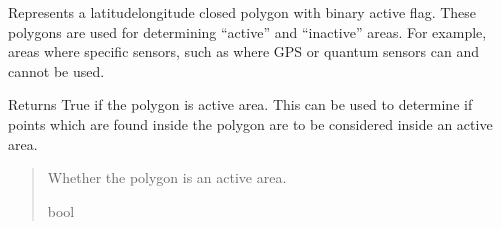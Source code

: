 \documentclass[letterpaper,10pt,english]{sphinxmanual}
\begin{document}
\begin{fulllineitems}
\label{\detokenize{modules/gps/zones:qnav.gps.zones.FlaggedPolygon}}
\pysigstartsignatures
{}
\pysigstopsignatures
\sphinxAtStartPar
Represents a latitude\sphinxhyphen{}longitude closed polygon with binary active flag.
These polygons are used for determining “active” and “inactive” areas.
For example, areas where specific sensors, such as where GPS or
quantum sensors can and cannot be used.

\begin{fulllineitems}
\label{\detokenize{modules/gps/zones:qnav.gps.zones.FlaggedPolygon.is_active_area}}
\pysigstartsignatures
{}
\pysigstopsignatures
\sphinxAtStartPar
Returns True if the polygon is active area.
This can be used to determine if points which are found inside the
polygon are to be considered inside an active area.
\begin{quote}\begin{description}
\sphinxAtStartPar
Whether the polygon is an active area.

\sphinxAtStartPar
bool

\end{description}\end{quote}

\end{fulllineitems}


\end{fulllineitems}

\end{document}
